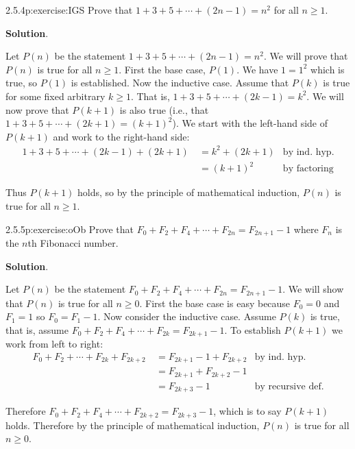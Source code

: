 \documentclass[twoside,11pt,]{book}
\newcommand{\blocktitlefont}{\relax}
\numberwithin{equation}{chapter}
\newcommand{\amp}{&}
\begin{document}
\begin{divisionsolution}{2.5.4}{}{p:exercise:IGS}%
Prove that \(1 + 3 + 5 + \cdots + (2n-1) = n^2\) for all \(n \ge 1\).%
\par\smallskip%
\noindent\textbf{\blocktitlefont Solution}.\quad{}\begin{solutionproof}
Let \(P(n)\) be the statement \(1+3 +5 + \cdots + (2n-1) = n^2\). We will prove that \(P(n)\) is true for all \(n \ge 1\). First the base case, \(P(1)\). We have \(1 = 1^2\) which is true, so \(P(1)\) is established. Now the inductive case. Assume that \(P(k)\) is true for some fixed arbitrary \(k \ge 1\). That is, \(1 + 3 + 5 + \cdots + (2k-1) = k^2\). We will now prove that \(P(k+1)\) is also true (i.e., that \(1 + 3 + 5 + \cdots + (2k+1) = (k+1)^2\)). We start with the left-hand side of \(P(k+1)\) and work to the right-hand side:%
\begin{align*}
1 + 3 + 5 + \cdots + (2k-1) + (2k+1) ~ \amp = k^2 + (2k+1) \amp \text{by ind. hyp.}\\
\amp = (k+1)^2 \amp \text{by factoring}
\end{align*}
%
\par
Thus \(P(k+1)\) holds, so by the principle of mathematical induction, \(P(n)\) is true for all \(n \ge 1\).%
\end{solutionproof}
\end{divisionsolution}%
\begin{divisionsolution}{2.5.5}{}{p:exercise:oOb}%
Prove that \(F_0 + F_2 + F_4 + \cdots + F_{2n} = F_{2n+1} - 1\) where \(F_n\) is the \(n\)th Fibonacci number.%
\par\smallskip%
\noindent\textbf{\blocktitlefont Solution}.\quad{}\begin{solutionproof}
Let \(P(n)\) be the statement \(F_0 + F_2 + F_4 + \cdots + F_{2n} = F_{2n+1} - 1\). We will show that \(P(n)\) is true for all \(n \ge 0\). First the base case is easy because \(F_0 = 0\) and \(F_1 = 1\) so \(F_0 = F_1 - 1\). Now consider the inductive case. Assume \(P(k)\) is true, that is, assume \(F_0 + F_2 + F_4 + \cdots + F_{2k} = F_{2k+1} - 1\). To establish \(P(k+1)\) we work from left to right:%
\begin{align*}
F_0 + F_2 + \cdots + F_{2k} + F_{2k+2} ~ \amp = F_{2k+1} - 1 + F_{2k+2} \amp \text{by ind. hyp.}\\
\amp = F_{2k+1} + F_{2k+2} - 1 \amp\\
\amp = F_{2k+3} - 1 \amp \text{by recursive def.}
\end{align*}
%
\par
Therefore \(F_0 + F_2 + F_4 + \cdots + F_{2k+2} = F_{2k+3} - 1\), which is to say \(P(k+1)\) holds. Therefore by the principle of mathematical induction, \(P(n)\) is true for all \(n \ge 0\).%
\end{solutionproof}
\end{divisionsolution}%
\end{document}
